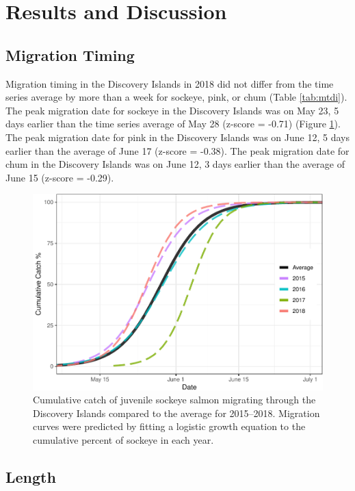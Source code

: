 \documentclass[fleqn,10pt]{wlpeerj} %
\begin{document}
\section*{Results and Discussion}\label{results-and-discussion}

\subsection*{Migration Timing}\label{migration-timing}

Migration timing in the Discovery Islands in 2018 did not differ from
the time series average by more than a week for sockeye, pink, or chum
(Table \ref{tab:mtdi}). The peak migration date for sockeye in the
Discovery Islands was on May 23, 5 days earlier than the time series
average of May 28 (z-score = -0.71) (Figure \ref{fig:mt}). The peak
migration date for pink in the Discovery Islands was on June 12, 5 days
earlier than the average of June 17 (z-score = -0.38). The peak
migration date for chum in the Discovery Islands was on June 12, 3 days
earlier than the average of June 15 (z-score = -0.29).

\begin{figure}[H]
\includegraphics[width=0.8\linewidth]{peer_j_migration_dynamics_files/figure-latex/mt-1} \caption{Cumulative catch of juvenile sockeye salmon migrating through the Discovery Islands compared to the average for 2015--2018. Migration curves were predicted by fitting a logistic growth equation to the cumulative percent of sockeye in each year.}\label{fig:mt}
\end{figure}

\subsection*{Length}\label{length}
\end{document}
